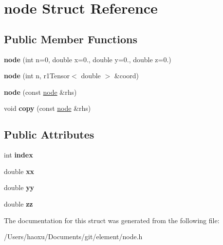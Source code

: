 \hypertarget{structnode}{}\section{node Struct Reference}
\label{structnode}
\subsection*{Public Member Functions}
\begin{DoxyCompactItemize}
\item 
\mbox{\label{structnode_ad19e263fcbe5d2ffec70b40818c6dc10}} 
{\bfseries node} (int n=0, double x=0., double y=0., double z=0.)
\item 
\mbox{\label{structnode_a1598c2f405acda6b1505be2a727b2cce}} 
{\bfseries node} (int n, r1\+Tensor$<$ double $>$ \&coord)
\item 
\mbox{\label{structnode_a6849162e873f597d90609d00a141f98d}} 
{\bfseries node} (const \hyperlink{structnode}{node} \&rhs)
\item 
\mbox{\label{structnode_a8ae2ec6f78a4989965068e15d8253e9b}} 
void {\bfseries copy} (const \hyperlink{structnode}{node} \&rhs)
\end{DoxyCompactItemize}
\subsection*{Public Attributes}
\begin{DoxyCompactItemize}
\item 
\mbox{\label{structnode_a5359a7ce1309be9415907be3ebbd2f91}} 
int {\bfseries index}
\item 
\mbox{\label{structnode_ad17f1c5ff47a87b556076964100ae29f}} 
double {\bfseries xx}
\item 
\mbox{\label{structnode_ae028aef81870b46c0bc9b348ba8fcd64}} 
double {\bfseries yy}
\item 
\mbox{\label{structnode_a0190e7bd9d3cffe85e91d2310bd49ca0}} 
double {\bfseries zz}
\end{DoxyCompactItemize}


The documentation for this struct was generated from the following file\+:\begin{DoxyCompactItemize}
\item 
/\+Users/haoxu/\+Documents/git/element/node.\+h\end{DoxyCompactItemize}
